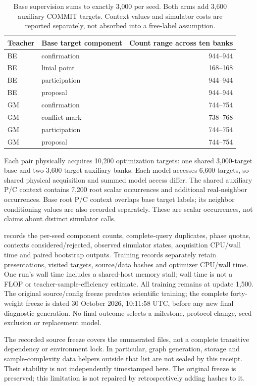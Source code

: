 \begin{table}[htbp]\centering\small
\begin{tabular}{llr}
\toprule Teacher & Base target component & Count range across ten banks \\
\midrule
BE & confirmation & 944--944 \\
BE & linial point & 168--168 \\
BE & participation & 944--944 \\
BE & proposal & 944--944 \\
GM & confirmation & 744--754 \\
GM & conflict mark & 738--768 \\
GM & participation & 744--754 \\
GM & proposal & 744--754 \\
\bottomrule
\end{tabular}
\caption{Base supervision sums to exactly 3,000 per seed. Both arms add
3,600 auxiliary COMMIT targets. Context values and simulator costs are
reported separately, not absorbed into a free-label assumption.}
\end{table}

Each pair physically acquires 10,200 optimization targets: one shared
3,000-target base and two 3,600-target auxiliary banks. Each model accesses
6,600 targets, so shared physical acquisition and summed model access differ.
The shared auxiliary P/C context contains 7,200 root scalar occurrences and
additional real-neighbor occurrences. Base root P/C context overlaps base
target labels; its neighbor conditioning values are also recorded separately.
These are scalar occurrences, not claims about distinct simulator calls.

 records the
per-seed component counts, complete-query duplicates, phase quotas, contexts
considered/rejected, observed simulator states, acquisition CPU/wall time and
paired bootstrap outputs. Training records separately retain presentations,
visited targets, source/data hashes and optimizer CPU/wall time. One run's
wall time includes a shared-host memory stall; wall time is not a FLOP or
teacher-sample-efficiency estimate. All training remains at update 1,500.
The original source/config freeze predates scientific training; the complete
forty-weight freeze is dated 30 October 2026, 10:11:58 UTC, before any new
final diagnostic generation. No final outcome selects a milestone, protocol
change, seed exclusion or replacement model.

The recorded source freeze covers the enumerated files, not a complete
transitive dependency or environment lock. In particular, graph generation,
storage and sample-complexity data helpers outside that list are not sealed
by this receipt. Their stability is not independently timestamped here.
The original freeze is preserved; this limitation is not repaired by
retrospectively adding hashes to it.




